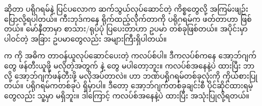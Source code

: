 ဆိုတာ ပရိုဂရမ်နဲ့ ပြင်ပလောက ဆက်သွယ်လုပ်ဆောင်တဲ့ ကိစ္စတွေလို့ အကြမ်းဖျဉ်း ပြောလို့ရပါတယ်။ ကီးဘုဒ်ကနေ ရိုက်ထည့်လိုက်တာကို ပရိုဂရမ်က ဖတ်တာဟာ  ဖြစ်တယ်။ မော်နီတာမှာ စာသား/ရုပ်ပုံ ပြပေးတာဟာ  ဥပမာ တစ်ခုဖြစ်တယ်။  အပိုင်းမှာ ပါဝင်တဲ့ အခြား ဥပမာတွေလည်း အများကြီးရှိပါတယ်။

 က  ကို အဓိက တာဝန်ယူလုပ်ဆောင်ပေးတဲ့ ကလပ်စ်ပါ။ ဒီကလပ်စ်ကနေ အော့ဘ်ဂျက်တွေ ဖန်တီးယူဖို့ မလိုတဲ့အတွက်  နဲ့  တွေ မပါတော့ဘူး။ ကလပ်စ်အနေနဲ့ပဲ ထားပြီး ဘာလို့ အော့ဘ်ဂျက်ဖန်တီးဖို့ မလိုအပ်တာလဲ။  ဟာ ဘဏ်ပရိုဂရမ်တစ်ခုလုံးကို ကိုယ်စားပြုတယ်။ ပရိုဂရမ်ကတစ်ခုပဲ ရှိမှာပါ။ ဒီတော့ အော့ဘ်ဂျက်တစ်ခုချင်းစီ ပိုင်ဆိုင်ထားရမဲ့  တွေလည်း သူ့မှာ မရှိဘူး။ ဒါကြောင့် ကလပ်စ်အနေနဲ့ပဲ ထားပြီး အသုံးပြုလို့ရတယ်။

